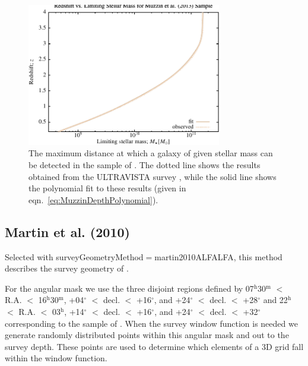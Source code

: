 \begin{figure}
 \begin{center}
 \includegraphics[width=85mm,trim=0mm 0mm 0mm 4mm,clip]{Plots/DataAnalysis/MuzzinULTRAVISTAMassRedshiftRelation.pdf}
 \end{center}
 \caption{The maximum distance at which a galaxy of given stellar mass can be detected in the sample of \protect\cite{muzzin_evolution_2013}. The dotted line shows the results obtained from the ULTRAVISTA survey \protect\citep{muzzin_evolution_2013}, while the solid line shows the polynomial fit to these results (given in eqn.~\ref{eq:MuzzinDepthPolynomial}).}
 \label{fig:MuzzinULTRAVISTADepthFit}
\end{figure}

\subsection{Martin et al. (2010)}\label{phys:surveyGeometry:surveyGeometryMartin2010ALFALFA}

Selected with {\normalfont \ttfamily surveyGeometryMethod}$=${\normalfont \ttfamily martin2010ALFALFA}, this method describes the survey geometry of \cite{martin_arecibo_2010}. 

For the angular mask we use the three disjoint regions defined by 07$^{\mathrm h}$30$^{\mathrm m}$ $<$ R.A. $<$ 16$^{\mathrm h}$30$^{\mathrm m}$, +04$^\circ$ $<$ decl. $<$ +16$^\circ$, and +24$^\circ$ $<$ decl. $<$ +28$^\circ$ and 22$^{\mathrm h}$ $<$ R.A. $<$ 03$^{\mathrm h}$, +14$^\circ$ $<$ decl. $<$ +16$^\circ$, and +24$^\circ$ $<$ decl. $<$ +32$^\circ$ corresponding to the sample of \cite{martin_arecibo_2010}. When the survey window function is needed we generate randomly distributed points within this angular mask and out to the survey depth. These points are used to determine which elements of a 3D grid fall within the window function.

